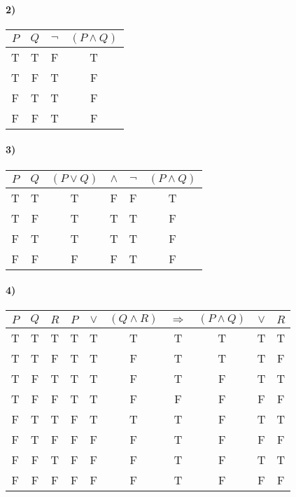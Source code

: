     \paragraph{2)}
    \begin{center}
    	\begin{tabular}{cc|cc}
    		$P$ & $Q$ & $\neg$ & $(P \land Q)$ \\
    		\hline
    		T & T & \color{red}F & T\\
    		T & F & \color{red}T & F\\
    		F & T & \color{red}T & F\\
    		F & F & \color{red}T & F\\
    	\end{tabular}
    \end{center}
    
    \paragraph{3)}
    \begin{center}
    	\begin{tabular}{cc|cccc}
    		$P$ & $Q$ & $(P \lor Q) $ & $\land$ & $\neg$ & $(P \land Q)$ \\
    		\hline
    		T & T & T & \color{red}F & F & T\\
    		T & F & T & \color{red}T & T & F\\
    		F & T & T & \color{red}T & T & F\\
    		F & F & F & \color{red}F & T & F\\
    	\end{tabular}
    \end{center}
    
    \paragraph{4)}
    \begin{center}
    	\begin{tabular}{ccc|ccccccc}
    		$P$ & $Q$ & $R$ & $P$ & $\lor$ & $(Q \land R)$ & $\Rightarrow$ & $(P \land Q)$ & $\lor$ & $R$ \\
    		\hline
    		T & T & T & T & T & T & \color{red}T & T & T & T\\
    		T & T & F & T & T & F & \color{red}T & T & T & F\\
    		T & F & T & T & T & F & \color{red}T & F & T & T\\
    		T & F & F & T & T & F & \color{red}F & F & F & F\\
    		F & T & T & F & T & T & \color{red}T & F & T & T\\
    		F & T & F & F & F & F & \color{red}T & F & F & F\\
    		F & F & T & F & F & F & \color{red}T & F & T & T\\
    		F & F & F & F & F & F & \color{red}T & F & F & F\\
    	\end{tabular}
    \end{center}

